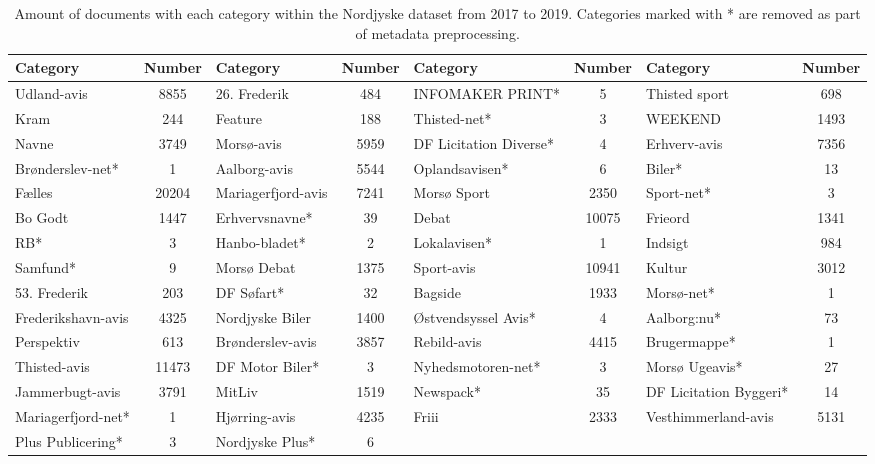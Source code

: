 \begin{table}[h]
	\centering
	\begin{tabular}{l|c|l|c|l|c|l|c}
		Category & Number & Category & Number & Category & Number & Category & Number \\
 		\toprule
		Udland-avis & 8855 & 26. Frederik & 484 & INFOMAKER PRINT* & 5 & Thisted sport & 698\\
		Kram & 244 & Feature & 188 & Thisted-net* & 3 & WEEKEND & 1493\\
		Navne & 3749 & Morsø-avis & 5959 & DF Licitation Diverse* & 4 & Erhverv-avis & 7356\\
		Brønderslev-net* & 1 & Aalborg-avis & 5544 & Oplandsavisen* & 6 & Biler* & 13\\
		Fælles & 20204 & Mariagerfjord-avis & 7241 & Morsø Sport & 2350 & Sport-net* & 3\\
		Bo Godt & 1447 & Erhvervsnavne* & 39 & Debat & 10075 & Frieord & 1341\\
		RB* & 3 & Hanbo-bladet* & 2 & Lokalavisen* & 1 & Indsigt & 984\\
		Samfund* & 9 & Morsø Debat & 1375 & Sport-avis & 10941 & Kultur & 3012 \\
		53. Frederik & 203 & DF Søfart* & 32 & Bagside & 1933 & Morsø-net* & 1 \\
		Frederikshavn-avis & 4325 & Nordjyske Biler & 1400 & Østvendsyssel Avis* & 4 & Aalborg:nu* & 73\\
		Perspektiv & 613 & Brønderslev-avis & 3857 & Rebild-avis & 4415 & Brugermappe* & 1\\
		Thisted-avis & 11473 & DF Motor Biler* & 3 & Nyhedsmotoren-net* & 3 & Morsø Ugeavis* & 27\\
		Jammerbugt-avis & 3791 & MitLiv & 1519 & Newspack* & 35 & DF Licitation Byggeri* & 14\\
		Mariagerfjord-net* & 1 & Hjørring-avis & 4235 & Friii & 2333 & Vesthimmerland-avis & 5131\\
		Plus Publicering* & 3 & Nordjyske Plus* & 6 & & & & \\
		\bottomrule
	\end{tabular}
	\caption{Amount of documents with each category within the Nordjyske dataset from 2017 to 2019. 
	Categories marked with * are removed as part of metadata preprocessing.}
	\label{tab:category_table}
\end{table}


